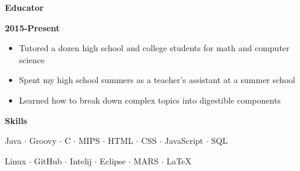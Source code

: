 \documentclass[12pt]{report}
\newcommand\barTitle[1]{\begin{center} \begin{Large}{\textbf{#1}}\end{Large}\end{center}}
\newcommand\tbf[1]{\begin{large} \textbf{#1} \end{large}}
\begin{document}
\begin{flushleft}
\tbf{Educator} \hfill \tbf{2015-Present}
\end{flushleft}

\begin{itemize}
\item Tutored a dozen high school and college students for math and computer science
\item Spent my high school summers as a teacher's assistant at a summer school
\item Learned how to break down complex topics into digestible components
\end{itemize}

\noindent\makebox[\linewidth]{\rule{7.5in}{0.4pt}}
\barTitle{Skills}
\begin{center}
Java $\cdot$ Groovy $\cdot$ C $\cdot$ MIPS $\cdot$ HTML $\cdot$ CSS $\cdot$ JavaScript $\cdot$ SQL 
\end{center}
\begin{center}
 Linux $\cdot$ GitHub $\cdot$ Intelij $\cdot$ Eclipse $\cdot$ MARS $\cdot$ LaTeX
\end{center}
\end{document}
